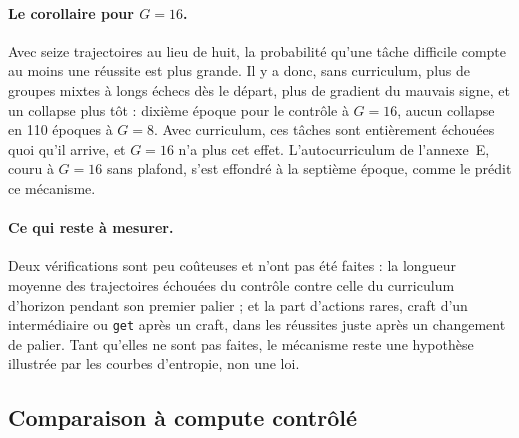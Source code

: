 \documentclass[11pt,a4paper]{article}
\begin{document}
\paragraph{Le corollaire pour $G=16$.} Avec seize trajectoires au lieu de huit, la probabilité qu'une tâche difficile compte au moins une réussite est plus grande. Il y a donc, sans curriculum, plus de groupes mixtes à longs échecs dès le départ, plus de gradient du mauvais signe, et un collapse plus tôt : dixième époque pour le contrôle à $G=16$, aucun collapse en 110 époques à $G=8$. Avec curriculum, ces tâches sont entièrement échouées quoi qu'il arrive, et $G=16$ n'a plus cet effet. L'autocurriculum de l'annexe~E, couru à $G=16$ sans plafond, s'est effondré à la septième époque, comme le prédit ce mécanisme.

\paragraph{Ce qui reste à mesurer.} Deux vérifications sont peu coûteuses et n'ont pas été faites : la longueur moyenne des trajectoires échouées du contrôle contre celle du curriculum d'horizon pendant son premier palier ; et la part d'actions rares, craft d'un intermédiaire ou \texttt{get} après un craft, dans les réussites juste après un changement de palier. Tant qu'elles ne sont pas faites, le mécanisme reste une hypothèse illustrée par les courbes d'entropie, non une loi.



\subsection{Comparaison à compute contrôlé}
\label{subsec:compute-controle}
\end{document}
